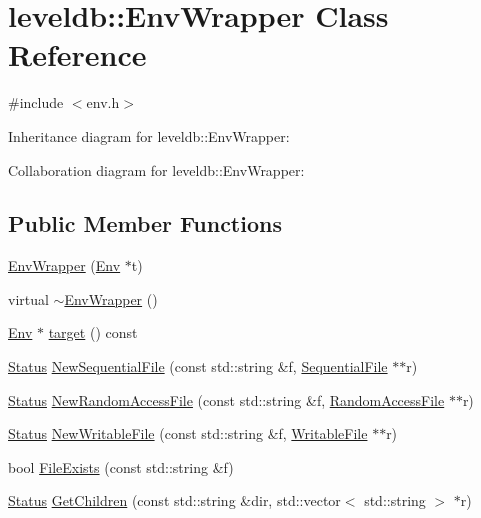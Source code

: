 \hypertarget{classleveldb_1_1_env_wrapper}{\section{leveldb\-:\-:Env\-Wrapper Class Reference}
\label{classleveldb_1_1_env_wrapper}
}


{\ttfamily \#include $<$env.\-h$>$}



Inheritance diagram for leveldb\-:\-:Env\-Wrapper\-:


Collaboration diagram for leveldb\-:\-:Env\-Wrapper\-:
\subsection*{Public Member Functions}
\begin{DoxyCompactItemize}
\item 
\hyperlink{classleveldb_1_1_env_wrapper_a724d3740db2663034c8974c0378e49cb}{Env\-Wrapper} (\hyperlink{classleveldb_1_1_env}{Env} $\ast$t)
\item 
virtual \hyperlink{classleveldb_1_1_env_wrapper_a4bdf170510b585276e41671ae1910837}{$\sim$\-Env\-Wrapper} ()
\item 
\hyperlink{classleveldb_1_1_env}{Env} $\ast$ \hyperlink{classleveldb_1_1_env_wrapper_a7b147ba21760b3545e757abcdc6dd9c5}{target} () const 
\item 
\hyperlink{classleveldb_1_1_status}{Status} \hyperlink{classleveldb_1_1_env_wrapper_acd23f5803f7841cfcee9a29ffc1c5b04}{New\-Sequential\-File} (const std\-::string \&f, \hyperlink{classleveldb_1_1_sequential_file}{Sequential\-File} $\ast$$\ast$r)
\item 
\hyperlink{classleveldb_1_1_status}{Status} \hyperlink{classleveldb_1_1_env_wrapper_ab8c78959e0d52f3c1beeeffc11ca0a34}{New\-Random\-Access\-File} (const std\-::string \&f, \hyperlink{classleveldb_1_1_random_access_file}{Random\-Access\-File} $\ast$$\ast$r)
\item 
\hyperlink{classleveldb_1_1_status}{Status} \hyperlink{classleveldb_1_1_env_wrapper_a2d2b29a658e80c326ddaeb9c4d74c483}{New\-Writable\-File} (const std\-::string \&f, \hyperlink{classleveldb_1_1_writable_file}{Writable\-File} $\ast$$\ast$r)
\item 
bool \hyperlink{classleveldb_1_1_env_wrapper_ac72ceac6f4e2a6140e2835b2fa15f4df}{File\-Exists} (const std\-::string \&f)
\item 
\hyperlink{classleveldb_1_1_status}{Status} \hyperlink{classleveldb_1_1_env_wrapper_abb7c1fd7d91c80b6efcf9967154a18f3}{Get\-Children} (const std\-::string \&dir, std\-::vector$<$ std\-::string $>$ $\ast$r)
$$
\end{DoxyCompactItemize}
